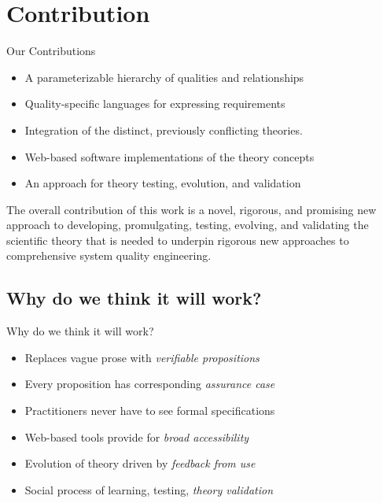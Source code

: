 \documentclass[xcolor=x11names,compress]{beamer}
\renewcommand{\(}{\begin{columns}}
\renewcommand{\)}{\end{columns}}
\newcommand{\<}[1]{\begin{column}{#1}}
\renewcommand{\>}{\end{column}}
\begin{document}

\section{Contribution}
\begin{frame}{Our Contributions}
\begin{itemize}
		\item A parameterizable hierarchy of qualities and relationships
		\item Quality-specific languages for expressing  requirements
		\item Integration of the distinct, previously conflicting theories.
		\item Web-based software implementations of the theory concepts
		\item An approach for theory testing, evolution, and validation
\end{itemize}
\vspace{0.5cm}		
		The overall contribution of this work is a novel, rigorous, and promising new approach to developing, promulgating, testing, evolving, and validating the scientific theory that is needed to underpin rigorous new approaches to comprehensive system quality engineering.
\end{frame}


\subsection{Why do we think it will work?}
\begin{frame}{Why do we think it will work?}
\begin{itemize}
\item Replaces vague prose with {\em verifiable propositions}
\item Every proposition has corresponding {\em assurance case}
\item Practitioners never have to see formal specifications
\item Web-based tools provide for {\em broad accessibility}
\item Evolution of theory driven by {\em feedback from use}
\item Social process of learning, testing, {\em theory validation}
\end{itemize}
\end{frame}
\end{document}
